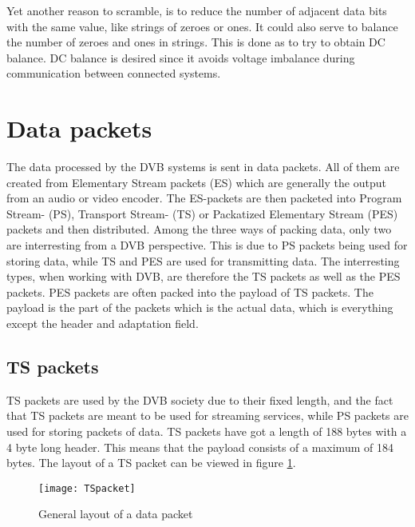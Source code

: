 
Yet another reason to scramble, is to reduce the number of adjacent 
data bits with the same value, like strings of zeroes or ones. It could 
also serve to balance the number of zeroes and ones in strings. This is 
done as to try to obtain DC balance. DC balance is desired since it 
avoids voltage imbalance during communication between connected systems.


\section{Data packets}\label{sec:Data}
The data processed by the DVB systems is sent in data packets. All of 
them are created from Elementary Stream packets (ES) which are 
generally the output from an audio or video encoder. The ES-packets are 
then packeted into Program Stream- (PS), Transport Stream- (TS) or 
Packatized Elementary Stream (PES) packets and then distributed. Among 
the three ways of packing data, only two are interresting from a DVB 
perspective. This is due to PS packets being used for storing data, 
while TS and PES are used for transmitting data. The interresting 
types, when working with DVB, are therefore the TS packets as well as 
the PES packets. PES packets are often packed into the payload of TS 
packets. The payload is the part of the packets which is the actual 
data, which is everything except the header and adaptation field.

\subsection{TS packets}
TS packets are used by the DVB society due to their fixed length, and 
the fact that TS packets are meant to be used for streaming services, 
while PS packets are used for storing packets of data. TS packets have 
got a length of 188 bytes with a 4 byte long header. This means that 
the payload consists of a maximum of 184 bytes. The layout of a TS 
packet can be viewed in figure \ref{img:Package}\citep{DVB:2013}.

\begin{figure}[h!]
  \texttt{[image: TSpacket]}
  \caption{General layout of a data packet}
  \label{img:Package}
\end{figure}


